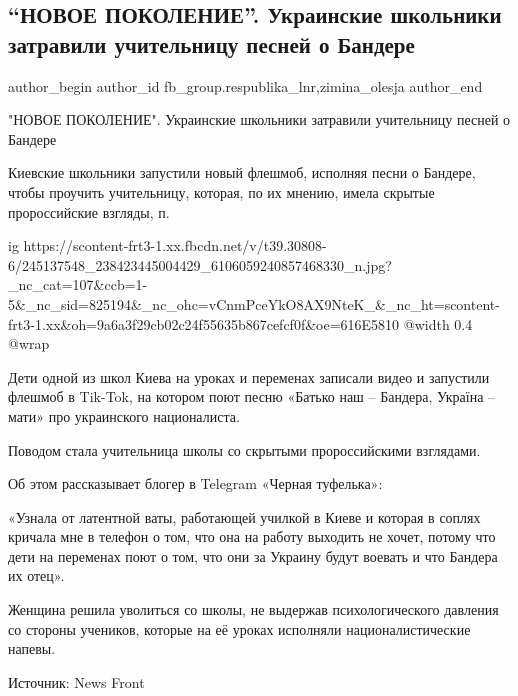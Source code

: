  
 
 
 
 
 
\subsection{\enquote{НОВОЕ ПОКОЛЕНИЕ}. Украинские школьники затравили учительницу песней о Бандере}
\label{sec:14_10_2021.fb.fb_group.respublika_lnr.1.deti_pokolenie_pesnja_bandera}
 
\ifcmt
 author_begin
   author_id fb_group.respublika_lnr,zimina_olesja
 author_end
\fi

"НОВОЕ ПОКОЛЕНИЕ". Украинские школьники затравили учительницу песней о Бандере

Киевские школьники запустили новый флешмоб, исполняя песни о Бандере, чтобы
проучить учительницу, которая, по их мнению, имела скрытые пророссийские
взгляды, п.

\ifcmt
  ig https://scontent-frt3-1.xx.fbcdn.net/v/t39.30808-6/245137548_238423445004429_6106059240857468330_n.jpg?_nc_cat=107&ccb=1-5&_nc_sid=825194&_nc_ohc=vCnmPceYkO8AX9NteK_&_nc_ht=scontent-frt3-1.xx&oh=9a6a3f29cb02c24f55635b867cefcf0f&oe=616E5810
  @width 0.4
  @wrap 
\fi

Дети одной из школ Киева на уроках и переменах записали видео и  запустили
флешмоб в Tik-Tok, на котором поют песню «Батько наш – Бандера, Україна – мати»
про украинского националиста.

Поводом стала учительница школы со скрытыми пророссийскими взглядами.

Об этом рассказывает блогер в Telegram «Черная туфелька»:

«Узнала от латентной ваты, работающей училкой в Киеве и которая в соплях
кричала мне в телефон о том, что она на работу выходить не хочет, потому что
дети на переменах поют о том, что они за Украину будут воевать и что Бандера их
отец».

Женщина решила уволиться со школы, не выдержав психологического давления со
стороны учеников, которые на её уроках исполняли националистические напевы.

Источник: News Front

